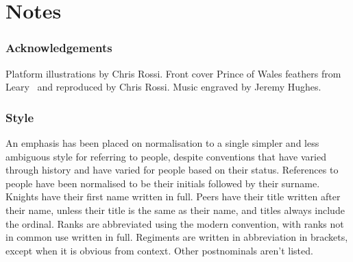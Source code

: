 \part{Notes}

\section*{Acknowledgements}

Platform illustrations by Chris Rossi. Front cover Prince of Wales feathers from Leary~\cite{leary} and reproduced by Chris Rossi. Music engraved by Jeremy Hughes.

\section*{Style}

An emphasis has been placed on normalisation to a single simpler and less ambiguous style for referring to people, despite conventions that have varied through history and have varied for people based on their status. References to people have been normalised to be their initials followed by their surname. Knights have their first name written in full. Peers have their title written after their name, unless their title is the same as their name, and titles always include the ordinal. Ranks are abbreviated using the modern convention, with ranks not in common use written in full. Regiments are written in abbreviation in brackets, except when it is obvious from context. Other postnominals aren't listed.
